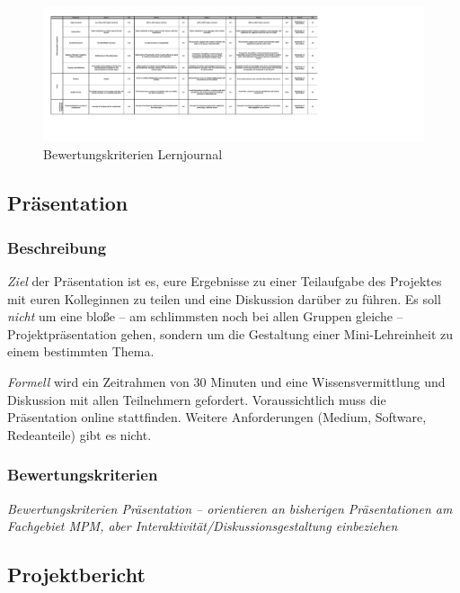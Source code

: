 \documentclass[DIV=15,headinclude=true]{scrartcl}
\begin{document}
\begin{figure}
	\centering
	\includegraphics[width=\textwidth]{figures/lernjournal}
	\caption{Bewertungskriterien Lernjournal}
	\label{abb:lernjournal}
\end{figure}

\subsection{Präsentation}

\subsubsection{Beschreibung}

\emph{Ziel} der Präsentation ist es, eure Ergebnisse zu einer
Teilaufgabe des Projektes mit euren Kolleginnen zu teilen und eine
Diskussion darüber zu führen. Es soll \emph{nicht} um eine bloße -- am
schlimmsten noch bei allen Gruppen gleiche -- Projektpräsentation gehen,
sondern um die Gestaltung einer Mini-Lehreinheit zu einem bestimmten
Thema.

\emph{Formell} wird ein Zeitrahmen von 30 Minuten und eine
Wissensvermittlung und Diskussion mit allen Teilnehmern gefordert.
Voraussichtlich muss die Präsentation online stattfinden. Weitere
Anforderungen (Medium, Software, Redeanteile) gibt es nicht.

\subsubsection{Bewertungskriterien}

\begin{framed}

	\emph{Bewertungskriterien Präsentation -- orientieren an bisherigen
		Präsentationen am Fachgebiet MPM, aber
		Interaktivität/Diskussionsgestaltung einbeziehen}

\end{framed}

\subsection{Projektbericht}
\end{document}
